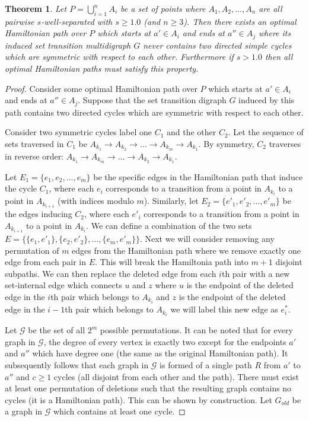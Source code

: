 \documentclass{article}
\newtheorem{thm}{Theorem}[section]
\theoremstyle{definition}
\newcommand{\GraphSet}{\mathcal{G}}
\begin{document}
\begin{thm}
    Let $P = \bigcup_{i=1}^n A_i$ be a set of points where $A_1, A_2, \ldots, A_n$ are all pairwise $s$-well-separated with $s \geq 1.0$ (and $n \geq 3$).
    Then there exists an optimal Hamiltonian path over $P$ which starts at $a' \in A_i$ and ends at $a'' \in A_j$ where its induced set transition multidigraph $G$ never contains two directed simple cycles which are symmetric with respect to each other.
    Furthermore if $s > 1.0$ then all optimal Hamiltonian paths must satisfy this property.
\end{thm}
\begin{proof}
    Consider some optimal Hamiltonian path over $P$ which starts at $a' \in A_i$ and ends at $a'' \in A_j$.
    Suppose that the set transition digraph $G$ induced by this path contains two directed cycles which are symmetric with respect to each other.

    Consider two symmetric cycles label one $C_1$ and the other $C_2$.
    Let the sequence of sets traversed in $C_1$ be $A_{k_1} \to A_{k_2} \to \dots \to A_{k_m} \to A_{k_1}$.
    By symmetry, $C_2$ traverses in reverse order: $A_{k_1} \to A_{k_m} \to \dots \to A_{k_2} \to A_{k_1}$.

    Let $E_1 = \{e_1, e_2, \dots, e_m\}$ be the specific edges in the Hamiltonian path that induce the cycle $C_1$, where each $e_i$ corresponds to a transition from a point in $A_{k_i}$ to a point in $A_{k_{i+1}}$ (with indices modulo $m$).
    Similarly, let $E_2 = \{e'_1, e'_2, \dots, e'_m\}$ be the edges inducing $C_2$, where each $e'_i$ corresponds to a transition from a point in $A_{k_{i+1}}$ to a point in $A_{k_i}$.
    We can define a combination of the two sets $E = \{\{e_1, e'_1\}, \{e_2, e'_2\}, \dots, \{e_m, e'_m\}\}$.
    Next we will consider removing any permutation of $m$ edges from the Hamiltonian path where we remove exactly one edge from each pair in $E$.
    This will break the Hamiltonia path into $m+1$ disjoint subpaths.
    We can then replace the deleted edge from each $i$th pair with a new set-internal edge which connects $u$ and $z$ where $u$ is the endpoint of the deleted edge in the $i$th pair which belongs to $A_{k_i}$ and $z$ is the endpoint of the deleted edge in the $i-1$th pair which belongs to $A_{k_i}$ we will label this new edge as $e^*_i$.
    
    Let $\GraphSet$ be the set of all $2^m$ possible permutations.
    It can be noted that for every graph in $\GraphSet$, the degree of every vertex is exactly two except for the endpoints $a'$ and $a''$ which have degree one (the same as the original Hamiltonian path).
    It subsequently follows that each graph in $\GraphSet$ is formed of a single path $R$ from $a'$ to $a''$ and $c \geq 1$ cycles (all disjoint from each other and the path).
    There must exist at least one permutation of deletions such that the resulting graph contains no cycles (it is a Hamiltonian path).
    This can be shown by construction.
    Let $G_{old}$ be a graph in $\GraphSet$ which contains at least one cycle.


\end{proof}
\end{document}
